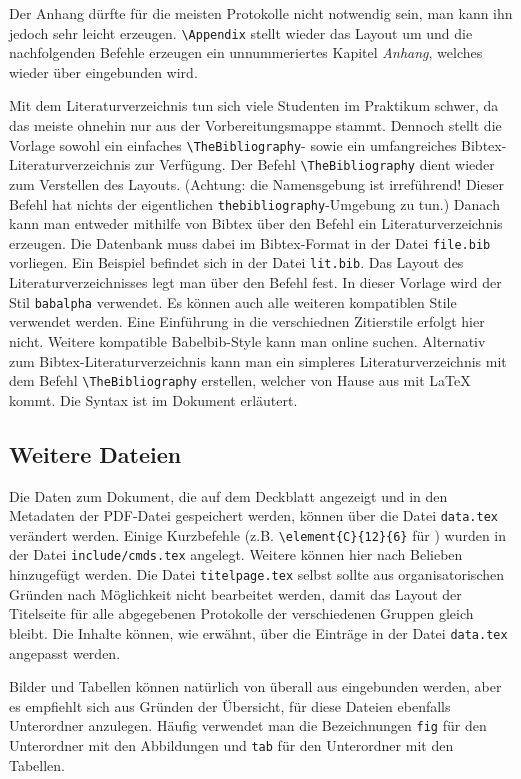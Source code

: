Der Anhang dürfte für die meisten Protokolle nicht notwendig sein, man kann ihn jedoch sehr leicht erzeugen. \verb|\Appendix| stellt wieder das Layout um und die nachfolgenden Befehle erzeugen ein unnummeriertes Kapitel \textit{Anhang}, welches wieder über \verb|| eingebunden wird.

Mit dem Literaturverzeichnis tun sich viele Studenten im Praktikum schwer, da das meiste ohnehin nur aus der Vorbereitungsmappe stammt. Dennoch stellt die Vorlage sowohl ein einfaches \verb|\TheBibliography|- sowie ein umfangreiches Bibtex-Literaturverzeichnis zur Verfügung. Der Befehl \verb|\TheBibliography| dient wieder zum Verstellen des Layouts. (Achtung: die Namensgebung ist irreführend! Dieser Befehl hat nichts der eigentlichen \verb|thebibliography|-Umgebung zu tun.) Danach kann man entweder mithilfe von Bibtex über den Befehl \verb|| ein Literaturverzeichnis erzeugen. Die Datenbank muss dabei im Bibtex-Format in der Datei \verb|file.bib| vorliegen. Ein Beispiel befindet sich in der Datei \verb|lit.bib|. Das Layout des Literaturverzeichnisses legt man über den Befehl \verb|| fest. In dieser Vorlage wird der Stil \verb|babalpha| verwendet. Es können auch alle weiteren kompatiblen Stile verwendet werden. Eine Einführung in die verschiednen Zitierstile erfolgt  hier nicht. Weitere kompatible Babelbib-Style kann man online suchen. Alternativ zum Bibtex-Literaturverzeichnis kann man ein simpleres Literaturverzeichnis mit dem Befehl \verb|\TheBibliography| erstellen, welcher von Hause aus mit LaTeX kommt. Die Syntax ist im Dokument erläutert.

\subsection{Weitere Dateien}
Die Daten zum Dokument, die auf dem Deckblatt angezeigt und in den Metadaten der PDF-Datei gespeichert werden, können über die Datei \verb|data.tex| verändert werden. Einige Kurzbefehle (z.B. \verb|\element{C}{12}{6}| für ) wurden in der Datei \verb|include/cmds.tex| angelegt. Weitere können hier nach Belieben hinzugefügt werden. Die Datei \verb|titelpage.tex| selbst sollte aus organisatorischen Gründen nach Möglichkeit nicht bearbeitet werden, damit das Layout der Titelseite für alle abgegebenen Protokolle der verschiedenen Gruppen gleich bleibt. Die Inhalte können, wie erwähnt, über die Einträge in der Datei \verb|data.tex| angepasst werden.

Bilder und Tabellen können natürlich von überall aus eingebunden werden, aber es empfiehlt sich aus Gründen der Übersicht, für diese Dateien ebenfalls Unterordner anzulegen. Häufig verwendet man die Bezeichnungen \verb|fig| für den Unterordner mit den Abbildungen und \verb|tab| für den Unterordner mit den Tabellen.



